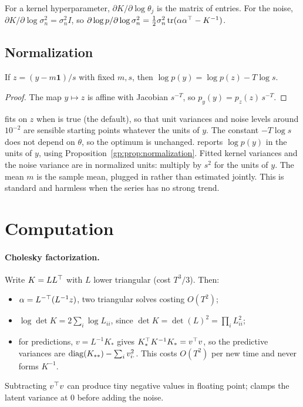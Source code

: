 For a kernel hyperparameter, $\partial K/\partial\log\theta_j$ is the matrix of
 entries. For the noise, $\partial K/\partial\log\sigma_n^2=\sigma_n^2I$, so
$\partial\log p/\partial\log\sigma_n^2=\tfrac12\sigma_n^2\operatorname{tr}(\alpha\alpha^\top-K^{-1})$.

\subsection{Normalization}\label{gp:sec:normalization}

\begin{proposition}\label{gp:prop:normalization}
If $z=(y-m\mathbf1)/s$ with fixed $m,s$, then $\log p(y)=\log p(z)-T\log s$.
\end{proposition}
\begin{proof}
The map $y\mapsto z$ is affine with Jacobian $s^{-T}$, so
$p_y(y)=p_z(z)\,s^{-T}$.
\end{proof}

 fits on $z$ when  is true (the default), so that
unit variances and noise levels around $10^{-2}$ are sensible starting points
whatever the units of $y$. The constant $-T\log s$ does not depend on $\theta$,
so the optimum is unchanged.  reports $\log p(y)$
in the units of $y$, using Proposition~\ref{gp:prop:normalization}. Fitted kernel
variances and the noise variance are in normalized units: multiply by $s^2$ for
the units of $y$. The mean $m$ is the sample mean, plugged in rather than estimated
jointly. This is standard and harmless when the series has no strong trend.

\section{Computation}

\paragraph{Cholesky factorization.} Write $K=LL^\top$ with $L$ lower triangular (cost $T^3/3$). Then:
\begin{itemize}
  \item $\alpha=L^{-\top}(L^{-1}z)$, two triangular solves costing $O(T^2)$;
  \item $\log\det K=2\sum_i\log L_{ii}$, since $\det K=\det(L)^2=\prod_iL_{ii}^2$;
  \item for predictions, $v=L^{-1}K_*$ gives $K_*^\top K^{-1}K_*=v^\top v$, so the
        predictive variances are $\operatorname{diag}(K_{**})-\sum_i v_{i\cdot}^2$. This costs $O(T^2)$ per
        new time and never forms $K^{-1}$.
\end{itemize}
Subtracting $v^\top v$ can produce tiny negative values in floating point;
 clamps the latent variance at $0$ before adding the noise.

